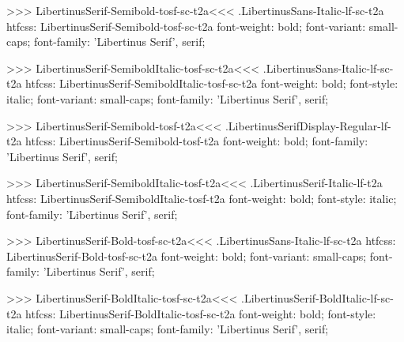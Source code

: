 {{{{{>>>
\<LibertinusSerif-Semibold-tosf-sc-t2a\><<<
.LibertinusSans-Italic-lf-sc-t2a
htfcss:  LibertinusSerif-Semibold-tosf-sc-t2a  font-weight: bold; font-variant: small-caps; font-family: 'Libertinus Serif', serif;

>>>
\<LibertinusSerif-SemiboldItalic-tosf-sc-t2a\><<<
.LibertinusSans-Italic-lf-sc-t2a
htfcss:  LibertinusSerif-SemiboldItalic-tosf-sc-t2a  font-weight: bold; font-style: italic; font-variant: small-caps; font-family: 'Libertinus Serif', serif;

>>>
\<LibertinusSerif-Semibold-tosf-t2a\><<<
.LibertinusSerifDisplay-Regular-lf-t2a
htfcss:  LibertinusSerif-Semibold-tosf-t2a  font-weight: bold; font-family: 'Libertinus Serif', serif;

>>>
\<LibertinusSerif-SemiboldItalic-tosf-t2a\><<<
.LibertinusSerif-Italic-lf-t2a
htfcss:  LibertinusSerif-SemiboldItalic-tosf-t2a  font-weight: bold; font-style: italic; font-family: 'Libertinus Serif', serif;

>>>
\<LibertinusSerif-Bold-tosf-sc-t2a\><<<
.LibertinusSans-Italic-lf-sc-t2a
htfcss:  LibertinusSerif-Bold-tosf-sc-t2a  font-weight: bold; font-variant: small-caps; font-family: 'Libertinus Serif', serif;

>>>
\<LibertinusSerif-BoldItalic-tosf-sc-t2a\><<<
.LibertinusSerif-BoldItalic-lf-sc-t2a
htfcss:  LibertinusSerif-BoldItalic-tosf-sc-t2a  font-weight: bold; font-style: italic; font-variant: small-caps; font-family: 'Libertinus Serif', serif;

}}}}}
